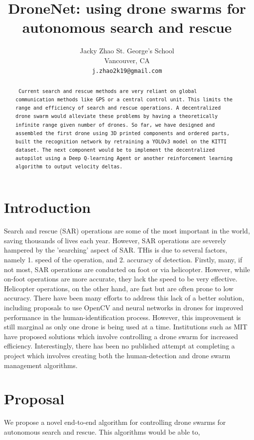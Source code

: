 \documentclass{article}
\title{DroneNet: using drone swarms for autonomous search and rescue}
\author{
  Jacky Zhao
  St. George's School\\
  Vancouver, CA\\
  \texttt{j.zhao2k19@gmail.com} \\
}
\begin{document}
\maketitle

\begin{abstract}
\texttt{
Current search and rescue methods are very reliant on global communication methods like GPS or a central control unit. This limits the range and efficiency of search and rescue operations. A decentralized drone swarm would alleviate these problems by having a theoretically infinite range given number of drones. So far, we have designed and assembled the first drone using 3D printed components and ordered parts, built the recognition network by retraining a YOLOv3 model on the KITTI dataset. The next component would be to implement the decentralized autopilot using a Deep Q-learning Agent or another reinforcement learning algorithm to output velocity deltas.
} \\
\end{abstract}


\section{Introduction}
Search and rescue (SAR) operations are some of the most important in the world, saving thousands of lives each year. However, SAR operations are severely hampered by the 'searching' aspect of SAR. THis is due to several factors, namely 1. speed of the operation, and 2. accuracy of detection. Firstly, many, if not most, SAR operations are conducted on foot or via helicopter. However, while on-foot operations are more accurate, they lack the speed to be very effective. Helicopter operations, on the other hand, are fast but are often prone to low accuracy. There have been many efforts to address this lack of a better solution, including proposals to use OpenCV and neural networks in drones for improved performance in the human-identification process. However, this improvement is still marginal as only one drone is being used at a time. Institutions such as MIT have proposed solutions which involve controlling a drone swarm for increased efficiency. Interestingly, there has been no published attempt at completing a project which involves creating both the human-detection and drone swarm management algorithms.

\section{Proposal}
\label{sec:headings}
We propose a novel end-to-end algorithm for controlling drone swarms for autonomous search and rescue. This algorithms would be able to,
\end{document}
